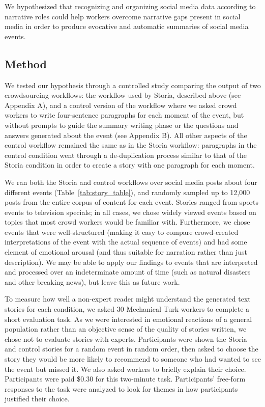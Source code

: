 We hypothesized that recognizing and organizing social media data according to narrative roles could help workers overcome narrative gaps present in social media in order to produce evocative and automatic summaries of social media events.


\subsection{Method}
We tested our hypothesis through a controlled study comparing the output of two crowdsourcing workflows: the workflow used by Storia, described above (see Appendix A), and a control version of the workflow where we asked crowd workers to write four-sentence paragraphs for each moment of the event, but without prompts to guide the summary writing phase or the questions and answers generated about the event (see Appendix B). All other aspects of the control workflow remained the same as in the Storia workflow: paragraphs in the control condition went through a de-duplication process similar to that of the Storia condition in order to create a story with one paragraph for each moment.

We ran both the Storia and control workflows over social media posts about four different events (Table~\ref{tab:story_table}), and randomly sampled up to 12,000 posts from the entire corpus of content for each event. Stories ranged from sports events to television specials; in all cases, we chose widely viewed events based on topics that most crowd workers would be familiar with. Furthermore, we chose events that were well-structured (making it easy to compare crowd-created interpretations of the event with the actual sequence of events) and had some element of emotional arousal (and thus suitable for narration rather than just description). 
We may be able to apply our findings to events that are interpreted and processed over an indeterminate amount of time (such as natural disasters and other breaking news), but leave this as future work.

To measure how well a non-expert reader might understand the generated text stories for each condition, we asked 30 Mechanical Turk workers to complete a short evaluation task. As we were interested in emotional reactions of a general population rather than an objective sense of the quality of stories written, we chose not to evaluate stories with experts. Participants were shown the Storia and control stories for a random event in random order, then asked to choose the story they would be more likely to recommend to someone who had wanted to see the event but missed it. We also asked workers to briefly explain their choice. Participants were paid \$0.30 for this two-minute task. Participants' free-form responses to the task were analyzed to look for themes in how participants justified their choice.


